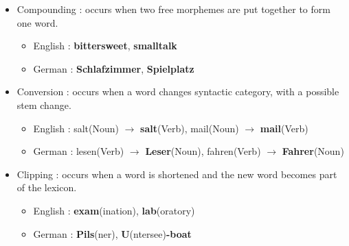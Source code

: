 \documentclass[11pt]{article}
\begin{document}
\begin{solution}
\begin{itemize}
	\item Compounding : occurs when two free morphemes are put together to form one word.
	\begin{itemize}
		\item English : \textbf{bittersweet}, \textbf{smalltalk} 
		\item German : \textbf{Schlafzimmer}, \textbf{Spielplatz}
	\end{itemize}
	\item Conversion : occurs when a word changes syntactic category, with a possible stem change.
	\begin{itemize}
		\item English : salt(Noun) $\rightarrow$ \textbf{salt}(Verb), {mail}(Noun) $\rightarrow$ \textbf{mail}(Verb)
		\item German : lesen(Verb) $\rightarrow$ \textbf{Leser}(Noun), fahren(Verb) $\rightarrow$ \textbf{Fahrer}(Noun)
	\end{itemize}
	\item Clipping : occurs when a word is shortened and the new word becomes part of the lexicon.
	\begin{itemize}
		\item English : \textbf{exam}(ination), \textbf{lab}(oratory)
		\item German : \textbf{Pils}(ner), \textbf{U}(ntersee)\textbf{-boat}
	\end{itemize}
\end{itemize}
\end{solution}

\vspace*{0.5cm}
\newpage
\end{document}
